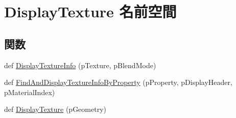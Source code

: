 \hypertarget{namespace_display_texture}{}\section{Display\+Texture 名前空間}
\label{namespace_display_texture}
\subsection*{関数}
\begin{DoxyCompactItemize}
\item 
def \hyperlink{namespace_display_texture_ac754509caa833a15e98cbeb4e0b4370b}{Display\+Texture\+Info} (p\+Texture, p\+Blend\+Mode)
\item 
def \hyperlink{namespace_display_texture_a14a510f441689b07a9c7582ca3f77b05}{Find\+And\+Display\+Texture\+Info\+By\+Property} (p\+Property, p\+Display\+Header, p\+Material\+Index)
\item 
def \hyperlink{namespace_display_texture_a196d9378478944c20fc1a6b74f2ffb95}{Display\+Texture} (p\+Geometry)
\end{DoxyCompactItemize}


